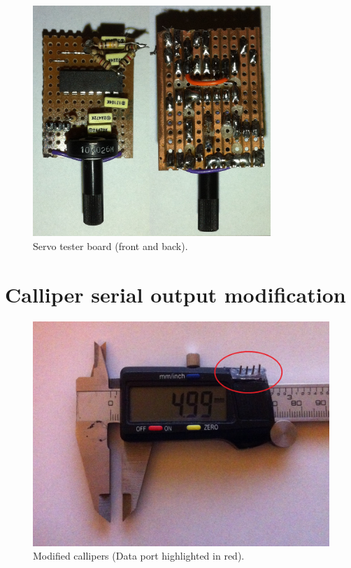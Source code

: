 \documentclass[a4paper,11pt]{article}  %
\begin{document}
\begin{figure}[ht!]
\centering
\includegraphics[width=90mm]{resources/servotester.jpg}
\caption{Servo tester board (front and back).}
\label{overflow}
\end{figure}

\newpage
\section{Calliper serial output modification}

\begin{figure}[ht!]
\centering
\includegraphics[width=150mm]{resources/callipermod.jpg}
\caption{Modified callipers (Data port highlighted in red).}
\label{overflow}
\end{figure}
\end{document}
